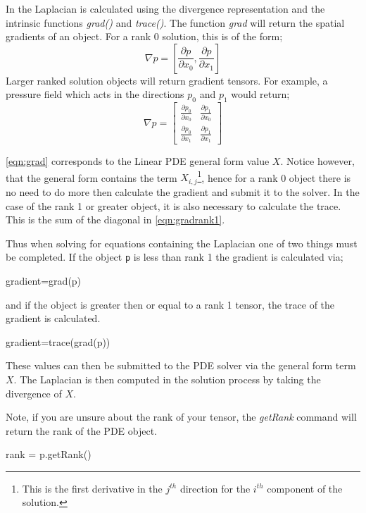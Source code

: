 In \esc the Laplacian is calculated using the divergence representation and the
intrinsic functions \textit{grad()} and \textit{trace()}. The function
\textit{grad{}} will return the spatial gradients of an object.  
For a rank 0 solution, this is of the form;
\begin{equation}
 \nabla p = \left[
	   \frac{\partial p}{\partial x _{0}},  
	   \frac{\partial p}{\partial x _{1}}
                  \right]
\label{eqn:grad}
\end{equation}
Larger ranked solution objects will return gradient tensors. For example, a
pressure field which acts in the directions $p _{0}$ and $p
_{1}$ would return;
\begin{equation}
  \nabla p = \begin{bmatrix}
	   \frac{\partial p _{0}}{\partial x _{0}} &
		\frac{\partial p _{1}}{\partial x _{0}} \\
	  \frac{\partial p _{0}}{\partial x _{1}} &
		\frac{\partial p _{1}}{\partial x _{1}} 
                  \end{bmatrix}
\label{eqn:gradrank1}
\end{equation}

\autoref{eqn:grad} corresponds to the Linear PDE general form value
$X$. Notice however, that the general form contains the term $X
_{i,j}$\footnote{This is the first derivative in the $j^{th}$
direction for the $i^{th}$ component of the solution.},
hence for a rank 0 object there is no need to do more then calculate the
gradient and submit it to the solver. In the case of the rank 1 or greater
object, it is also necessary to calculate the trace. This is the sum of the
diagonal in \autoref{eqn:gradrank1}. 

Thus when solving for equations containing the Laplacian one of two things must
be completed. If the object \verb!p! is less than rank 1 the gradient is
calculated via;
\begin{python}
gradient=grad(p)
\end{python}
and if the object is greater then or equal to a rank 1 tensor, the trace of
the gradient is calculated.
\begin{python}
 gradient=trace(grad(p))
\end{python}
These values can then be submitted to the PDE solver via the general form term
$X$. The Laplacian is then computed in the solution process by taking the
divergence of $X$.

Note, if you are unsure about the rank of your tensor, the \textit{getRank}
command will return the rank of the PDE object.
\begin{python}
 rank = p.getRank()
\end{python}


